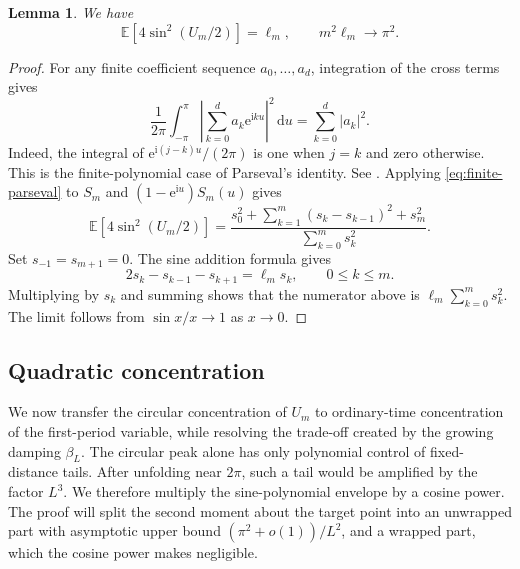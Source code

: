 \documentclass[11pt]{article}
\numberwithin{equation}{section}
\newtheorem{lemma}[theorem]{Lemma}
\theoremstyle{remark}
\newcommand{\E}{\mathbb E}
\newcommand{\e}{\mathrm e}
\newcommand{\ii}{\mathrm i}
\newcommand{\dd}{\,\mathrm d}
\begin{document}
\begin{lemma}\label{lem:sine-moment}
We have
\begin{equation}\label{eq:circular-moment}
  \E\!\left[4\sin^2(U_m/2)\right]=\ell_m,
  \qquad m^2\ell_m\longrightarrow\pi^2.
\end{equation}
\end{lemma}

\begin{proof}
For any finite coefficient sequence $a_0,\ldots,a_d$, integration of the cross terms gives
\begin{equation}\label{eq:finite-parseval}
  \frac1{2\pi}\int_{-\pi}^{\pi}
    \left|\sum_{k=0}^{d}a_k\e^{\ii ku}\right|^2\dd u
  =\sum_{k=0}^{d}|a_k|^2.
\end{equation}
Indeed, the integral of $\e^{\ii(j-k)u}/(2\pi)$ is one when $j=k$ and zero otherwise. This is the finite-polynomial case of Parseval's identity. See \citet[Chapter~3, Theorem~1.3(ii)]{SteinShakarchi2003}. Applying \eqref{eq:finite-parseval} to $S_m$ and $(1-\e^{\ii u})S_m(u)$ gives
\[
  \E\!\left[4\sin^2(U_m/2)\right]
  =\frac{s_0^2+\sum_{k=1}^{m}(s_k-s_{k-1})^2+s_m^2}
         {\sum_{k=0}^{m}s_k^2}.
\]
Set $s_{-1}=s_{m+1}=0$. The sine addition formula gives
\[
  2s_k-s_{k-1}-s_{k+1}=\ell_m s_k,
  \qquad 0\leq k\leq m.
\]
Multiplying by $s_k$ and summing shows that the numerator above is $\ell_m\sum_{k=0}^{m}s_k^2$. The limit follows from $\sin x/x\to1$ as $x\to0$.
\end{proof}

\subsection{Quadratic concentration}
We now transfer the circular concentration of $U_m$ to ordinary-time concentration of the first-period variable, while resolving the trade-off created by the growing damping $\beta_L$. The circular peak alone has only polynomial control of fixed-distance tails. After unfolding near $2\pi$, such a tail would be amplified by the factor $L^3$. We therefore multiply the sine-polynomial envelope by a cosine power. The proof will split the second moment about the target point into an unwrapped part with asymptotic upper bound $(\pi^2+o(1))/L^2$, and a wrapped part, which the cosine power makes negligible.
\end{document}
